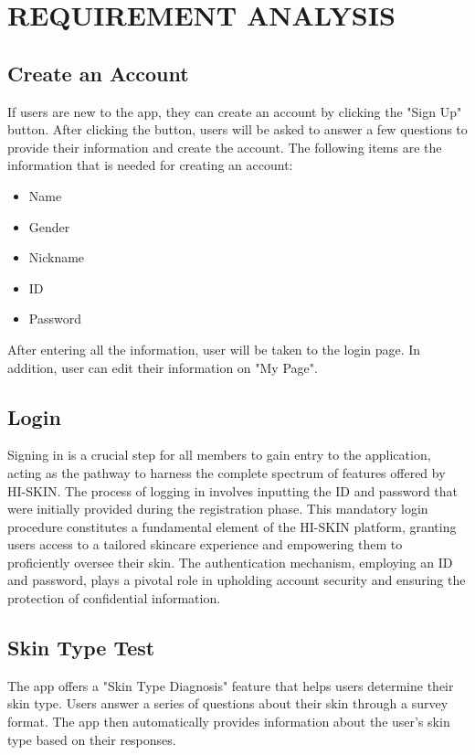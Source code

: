 \documentclass[conference]{IEEEtran}
\begin{document}
\section{REQUIREMENT ANALYSIS}

\subsection{Create an Account}
If users are new to the app, they can create an account by clicking the "Sign Up" button. After clicking the button, users will be asked to answer a few questions to provide their information and create the account. The following items are the information that is needed for creating an account:
\begin{itemize}
    \item Name
    \item Gender
    \item Nickname
    \item ID 
    \item Password
\end{itemize}
After entering all the information, user will be taken to the login page. In addition, user can edit their information on "My Page".\\
\subsection{Login}
Signing in is a crucial step for all members to gain entry to the application, acting as the pathway to harness the complete spectrum of features offered by HI-SKIN. The process of logging in involves inputting the ID and password that were initially provided during the registration phase. This mandatory login procedure constitutes a fundamental element of the HI-SKIN platform, granting users access to a tailored skincare experience and empowering them to proficiently oversee their skin. The authentication mechanism, employing an ID and password, plays a pivotal role in upholding account security and ensuring the protection of confidential information.\\
\subsection{Skin Type Test}
The app offers a "Skin Type Diagnosis" feature that helps users determine their skin type. Users answer a series of questions about their skin through a survey format. The app then automatically provides information about the user's skin type based on their responses.\\
\end{document}
